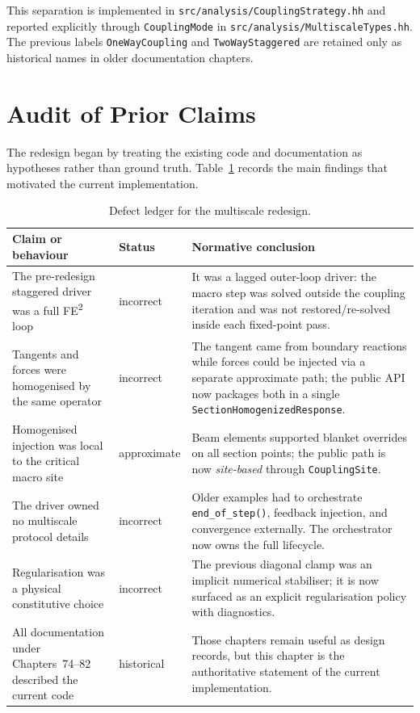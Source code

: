 This separation is implemented in
\texttt{src/analysis/CouplingStrategy.hh} and reported explicitly through
\texttt{CouplingMode} in \texttt{src/analysis/MultiscaleTypes.hh}.  The
previous labels \texttt{OneWayCoupling} and \texttt{TwoWayStaggered} are
retained only as historical names in older documentation chapters.

\section{Audit of Prior Claims}
\label{sec:ms-pub-audit}

The redesign began by treating the existing code and documentation as
hypotheses rather than ground truth.  Table~\ref{tab:ms-defect-ledger}
records the main findings that motivated the current implementation.

\begin{table}[htb]
\centering
\small
\begin{tabular}{p{}p{}p{}}
\toprule
Claim or behaviour & Status & Normative conclusion \\
\midrule
The pre-redesign staggered driver was a full FE\textsuperscript{2} loop
  & incorrect
  & It was a lagged outer-loop driver: the macro step was solved outside the
    coupling iteration and was not restored/re-solved inside each fixed-point
    pass. \\
Tangents and forces were homogenised by the same operator
  & incorrect
  & The tangent came from boundary reactions while forces could be injected via
    a separate approximate path; the public API now packages both in a single
    \texttt{SectionHomogenizedResponse}. \\
Homogenised injection was local to the critical macro site
  & approximate
  & Beam elements supported blanket overrides on all section points; the public
    path is now \emph{site-based} through \texttt{CouplingSite}. \\
The driver owned no multiscale protocol details
  & incorrect
  & Older examples had to orchestrate \texttt{end\_of\_step()}, feedback
    injection, and convergence externally.  The orchestrator now owns the full
    lifecycle. \\
Regularisation was a physical constitutive choice
  & incorrect
  & The previous diagonal clamp was an implicit numerical stabiliser; it is now
    surfaced as an explicit regularisation policy with diagnostics. \\
All documentation under Chapters~74--82 described the current code
  & historical
  & Those chapters remain useful as design records, but this chapter is the
    authoritative statement of the current implementation. \\
\bottomrule
\end{tabular}
\caption{Defect ledger for the multiscale redesign.}
\label{tab:ms-defect-ledger}
\end{table}

